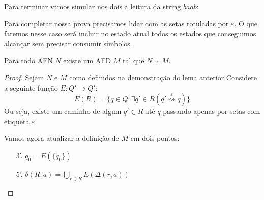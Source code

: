 \begin{example}
Para terminar vamos simular nos dois a leitura da string $baab$:

\begin{multicols}{2}

\begin{center}
\end{center}
\columnbreak

\begin{center}
\end{center}
\end{multicols}
\end{example}

Para completar nossa prova precisamos lidar com as setas rotuladas por $\varepsilon$.
O que faremos nesse caso será incluir no estado atual todos os estados que conseguimos alcançar sem precisar consumir símbolos.


\begin{theorem}
  Para todo AFN $N$ existe um AFD $M$ tal que $N \sim M$.
\end{theorem}
\begin{proof}
  Sejam $N$ e $M$ como definidos na demonstração do lema anterior
  Considere a seguinte função $E: Q' \to Q'$:
  \begin{displaymath}
    E(R) = \{q \in Q: \exists q' \in R(q' \stackrel{\varepsilon}{\rightsquigarrow} q) \}
  \end{displaymath}
  Ou seja, existe um caminho de algum $q' \in R$ até $q$ passando apenas por setas com etiqueta $\varepsilon$.

  Vamos agora atualizar a definição de $M$ em dois pontos:

  \begin{enumerate}
  \item[3'.] $q_0 = E(\{q_0\})$
  \item[5'.] $\delta(R,a) = \bigcup_{r \in R} E(\Delta(r,a))$
  \end{enumerate}
\end{proof}


